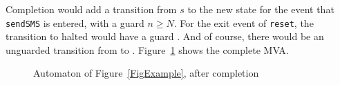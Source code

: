 Completion would add a transition from \(s\) to the new state \halted
for the event that \texttt{sendSMS} is entered, with a guard \(n \geq
N\). For the exit event of \texttt{reset}, the transition to halted
would have a guard \fff. And of course, there would be an unguarded
transition from \halted to \halted. Figure~\ref{FigCompleteMVA} shows
the complete MVA.

\begin{figure}[t]
\begin{center}
\end{center}
\label{FigCompleteMVA}
\caption{Automaton of Figure~\ref{FigExample}, after completion}
\end{figure}
